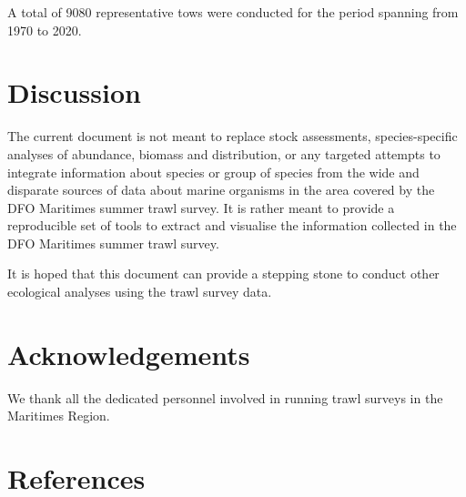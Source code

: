 \documentclass[12pt]{article}\usepackage[]{graphicx}\usepackage[]{color}
\begin{document}
\endgroup{}

A total of 9080 representative tows were conducted for the period spanning from 1970 to 2020.

\hypertarget{discussion}{%
\section{Discussion}\label{discussion}}

The current document is not meant to replace stock assessments, species-specific analyses of abundance, biomass and distribution, or any targeted attempts to integrate information about species or group of species from the wide and disparate sources of data about marine organisms in the area covered by the DFO Maritimes summer trawl survey. It is rather meant to provide a reproducible set of tools to extract and visualise the information collected in the DFO Maritimes summer trawl survey.

It is hoped that this document can provide a stepping stone to conduct other ecological analyses using the trawl survey data.

\hypertarget{acknowledgements}{%
\section{Acknowledgements}\label{acknowledgements}}

We thank all the dedicated personnel involved in running trawl surveys in the Maritimes Region.

\clearpage

\hypertarget{references}{%
\section{References}\label{references}}

\noindent \vspace{-2em} \setlength{\parindent}{-0.2in} \setlength{\leftskip}{0.2in} \setlength{\parskip}{8pt}
\end{document}
